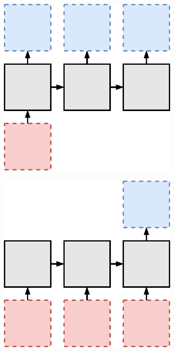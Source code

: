 \begin{figure}[htpb]
\centering
\begin{subfigure}{0.3\textwidth}
  \centering
  \includegraphics[width=.8\linewidth]{figures/one2many.pdf}
  \caption{}
  \label{fig:rnn-one2many}
\end{subfigure}%
\begin{subfigure}{0.3\textwidth}
  \centering
  \includegraphics[width=.8\linewidth]{figures/many2one.pdf}
  \caption{}
  \label{fig:rnn-many2one}
\end{subfigure}
\begin{subfigure}{0.3\textwidth}

\end{subfigure}
\end{figure}
